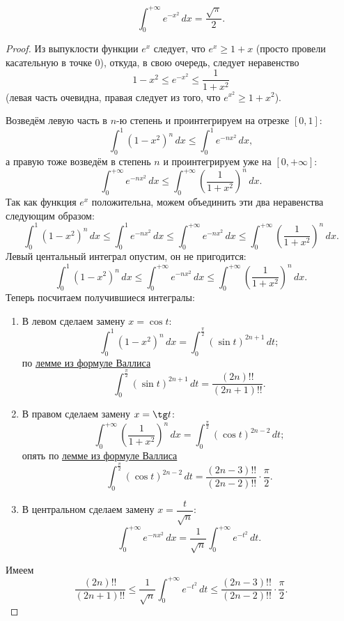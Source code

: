 \begin{theorem}
	\[
		\int_0^{+\infty} e^{-x^2} \, dx = \frac{\sqrt{\pi}}{2}.
	\]
\end{theorem}

\begin{proof}
	Из выпуклости функции \(e^x\) следует, что \(e^x \geqslant 1 + x\) (просто провели касательную в точке \(0\)), откуда, в свою очередь, следует неравенство \[
		1 - x^2 \leqslant e^{-x^2} \leqslant \frac{1}{1 + x^2}
	\]
	(левая часть очевидна, правая следует из того, что \(e^{x^2} \geqslant 1 + x^2\)).
	
	Возведём левую часть в \(n\)-ю степень и проинтегрируем на отрезке \([0, 1]\): \[
		\int_0^1 (1 - x^2)^n \, dx \leqslant \int_0^1 e^{-nx^2} \, dx,
	\]
	а правую тоже возведём в степень \(n\) и проинтегрируем уже на \([0, +\infty]\): \[
			\int_0^{+\infty} e^{-nx^2} \, dx \leqslant \int_0^{+\infty} \left(\frac{1}{1 + x^2} \right)^n \, dx.
	\]
	Так как функция \(e^x\) положительна, можем объединить эти два неравенства следующим образом: \[
		\int_0^1 (1 - x^2)^n \, dx \leqslant \int_0^1 e^{-nx^2} \, dx \leqslant \int_0^{+\infty} e^{-nx^2} \, dx \leqslant \int_0^{+\infty} \left(\frac{1}{1 + x^2} \right)^n \, dx.
	\]
	Левый центальный интеграл опустим, он не пригодится: \[
		\int_0^1 (1 - x^2)^n \, dx \leqslant \int_0^{+\infty} e^{-nx^2} \, dx \leqslant \int_0^{+\infty} \left(\frac{1}{1 + x^2} \right)^n \, dx.
	\]
	Теперь посчитаем получившиеся интегралы:
	\begin{enumerate}
		\item В левом сделаем замену \(x = \cos t\): \[
			\int_0^1 (1 - x^2)^n \, dx = \int_0^{\frac{\pi}{2}} (\sin t)^{2n + 1} \, dt;
		\]
		по \hyperlink{vallem}{лемме из формуле Валлиса} \[
			\int_0^{\frac{\pi}{2}} (\sin t)^{2n + 1} \, dt = \frac{(2n)!!}{(2n + 1)!!}.
		\]
		\item В правом сделаем замену \(x = \tg t\): \[
			\int_0^{+\infty} \left(\frac{1}{1 + x^2} \right)^n \, dx = \int_{0}^{\frac{\pi}{2}} (\cos t)^{2n - 2} \, dt;
		\]
		опять по \hyperlink{vallem}{лемме из формуле Валлиса} \[
			\int_{0}^{\frac{\pi}{2}} (\cos t)^{2n - 2} \, dt  = \frac{(2n - 3)!!}{(2n - 2)!!} \cdot \frac{\pi}{2}.
		\]
		\item В центральном сделаем замену \(x = \dfrac{t}{\sqrt{n}}\): \[
			\int_0^{+\infty} e^{-nx^2} \, dx = \frac{1}{\sqrt{n}} \int_0^{+\infty} e^{-t^2} \, dt.
		\]
	\end{enumerate}
	Имеем \[
		\frac{(2n)!!}{(2n + 1)!!} \leqslant \frac{1}{\sqrt{n}} \int_0^{+\infty} e^{-t^2} \, dt \leqslant \frac{(2n - 3)!!}{(2n - 2)!!} \cdot \frac{\pi}{2}.
\]
\end{proof}

